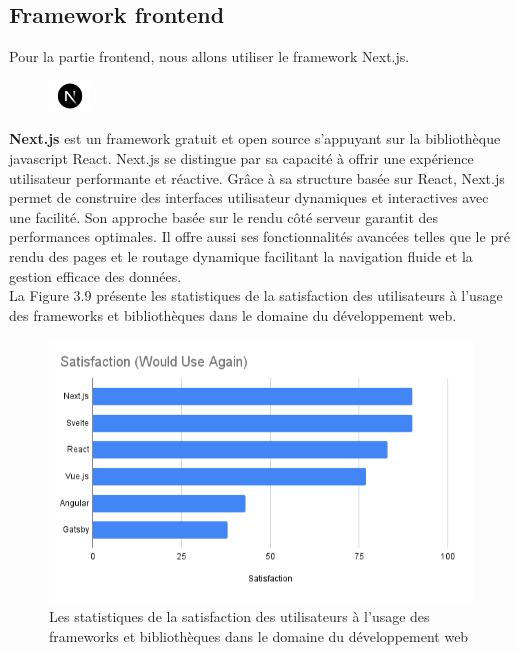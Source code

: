 \subsection{Framework frontend}
\noindent Pour la partie frontend, nous allons utiliser le framework Next.js.
\vspace{0.5em}
\begin{figure}
    \vspace{-15pt}
    \includegraphics[width=0.1\textwidth]{images/chp5/nextjs.png}
\end{figure}
\textbf{Next.js} est un framework gratuit et open source s'appuyant sur la bibliothèque javascript React. Next.js se distingue par sa capacité à offrir une expérience utilisateur performante et réactive. Grâce à sa structure basée sur React, Next.js permet de construire des interfaces utilisateur dynamiques et interactives avec une facilité. Son approche basée sur le rendu côté serveur garantit des performances optimales. Il offre aussi ses fonctionnalités avancées telles que le pré rendu des pages et le routage dynamique facilitant la navigation fluide et la gestion efficace des données.\\
La Figure 3.9 présente les statistiques de la satisfaction des utilisateurs à l’usage des frameworks et bibliothèques dans le domaine du développement web.
    \begin{figure}[H]
        \centering
        \includegraphics[width=1\textwidth,height=0.4\textheight]{images/chp3/fig9.png}
        \caption{Les statistiques de la satisfaction des utilisateurs à l’usage des frameworks et bibliothèques dans le domaine du développement web\cite{StatsFramework}}        
        \label{fig:Les statistiques de la satisfaction des utilisateurs à l’usage des frameworks et bibliothèques dans le domaine du développement web}    
    \end{figure}

